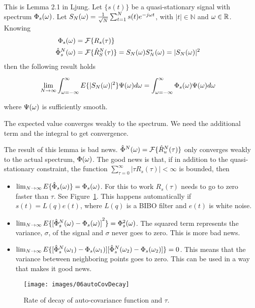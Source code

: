 \begin{lemma}
This is Lemma 2.1 in Ljung.
Let $\{s(t)\}$ be a quasi-stationary signal with spectrum $\Phi_s(\omega)$.
Let $S_N(\omega) = \frac{1}{\sqrt{N}} \sum_{t=1}^N s(t)e^{-j\omega t}$, with $|t|\in\mathbb{N}$ and $\omega\in\mathbb{R}$.
Knowing
\begin{align*}
\Phi_s(\omega) &= \mathcal{F}\{R_s(\tau)\} \\
\hat{\Phi}_s^N(\omega) &= \mathcal{F}\{\hat{R}_S^N(\tau)\} = S_N(\omega)S_N^*(\omega) = |S_N(\omega)|^2
\end{align*}
then the following result holds

\begin{equation*}
\lim_{N\to\infty} \int_{\omega=-\infty}^\infty E\{|S_N(\omega)|^2\}\Psi(\omega)d\omega = \int_{\omega=-\infty}^\infty \Phi_s(\omega)\Psi(\omega)d\omega
\end{equation*}

where $\Psi(\omega)$ is sufficiently smooth.
\end{lemma}
The expected value converges weakly to the spectrum.
We need the additional term and the integral to get convergence.

The result of this lemma is bad news.
$\hat{\Phi}^N(\omega) = \mathcal{F}\{\hat{R}_u^N(\tau)\}$ only converges weakly to the actual spectrum, $\Phi(\omega)$.
The good news is that, if in addition to the quasi-stationary constraint, the function $\sum_{\tau=0}^\infty|\tau R_s(\tau)|<\infty$ is bounded, then
\begin{itemize}
\item $\lim_{N\to\infty}E\{\hat{\Phi}_s(\omega)\} = \Phi_s(\omega)$.
      For this to work $R_s(\tau)$ needs to go to zero faster than $\tau$.
      See Figure~\ref{fig:06autoCovDecay}.
      This happens automatically if $s(t)=L(q)e(t)$, where $L(q)$ is a BIBO filter and $e(t)$ is white noise.
\item $\lim_{N\to\infty}E\{{[\hat{\Phi}_s^N(\omega)-\Phi_s(\omega)]}^2\} = \Phi_s^2(\omega)$.
      The squared term represents the variance, $\sigma$, of the signal and $\sigma$ never goes to zero.
      This is more bad news.
\item $\lim_{N\to\infty}E\{[\hat{\Phi}_s^N(\omega_1)-\Phi_s(\omega_1)][\hat{\Phi}_s^N(\omega_2)-\Phi_s(\omega_2)]\} = 0$.
      This means that the variance beteween neighboring points goes to zero.
      This can be used in a way that makes it good news.
\end{itemize}

\begin{figure}[ht!]
\centering
\texttt{[image: images/06autoCovDecay]}
\caption{Rate of decay of auto-covariance function and $\tau$.}%
\label{fig:06autoCovDecay}
\end{figure}

